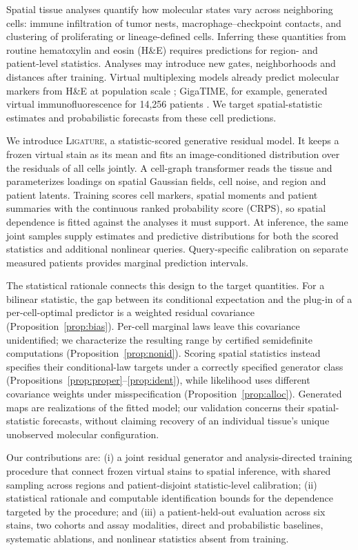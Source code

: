 \documentclass[10pt,letterpaper]{article}
\theoremstyle{definition}
\theoremstyle{remark}
\newcommand{\method}{\textnormal{\textsc{Ligature}}}
\begin{document}
Spatial tissue analyses quantify how molecular states vary across neighboring cells: immune infiltration of tumor nests, macrophage--checkpoint contacts, and clustering of proliferating or lineage-defined cells. Inferring these quantities from routine hematoxylin and eosin (H\&E) requires predictions for region- and patient-level statistics. Analyses may introduce new gates, neighborhoods and distances after training. Virtual multiplexing models already predict molecular markers from H\&E at population scale \citep{gigatime2025,rosie2025,hex2026}; GigaTIME, for example, generated virtual immunofluorescence for 14,256 patients \citep{gigatime2025}. We target spatial-statistic estimates and probabilistic forecasts from these cell predictions.

We introduce \method{}, a statistic-scored generative residual model. It keeps a frozen virtual stain as its mean and fits an image-conditioned distribution over the residuals of all cells jointly. A cell-graph transformer reads the tissue and parameterizes loadings on spatial Gaussian fields, cell noise, and region and patient latents. Training scores cell markers, spatial moments and patient summaries with the continuous ranked probability score (CRPS), so spatial dependence is fitted against the analyses it must support. At inference, the same joint samples supply estimates and predictive distributions for both the scored statistics and additional nonlinear queries. Query-specific calibration on separate measured patients provides marginal prediction intervals.

The statistical rationale connects this design to the target quantities. For a bilinear statistic, the gap between its conditional expectation and the plug-in of a per-cell-optimal predictor is a weighted residual covariance (Proposition~\ref{prop:bias}). Per-cell marginal laws leave this covariance unidentified; we characterize the resulting range by certified semidefinite computations (Proposition~\ref{prop:nonid}). Scoring spatial statistics instead specifies their conditional-law targets under a correctly specified generator class (Propositions~\ref{prop:proper}--\ref{prop:ident}), while likelihood uses different covariance weights under misspecification (Proposition~\ref{prop:alloc}). Generated maps are realizations of the fitted model; our validation concerns their spatial-statistic forecasts, without claiming recovery of an individual tissue's unique unobserved molecular configuration.

Our contributions are: (i) a joint residual generator and analysis-directed training procedure that connect frozen virtual stains to spatial inference, with shared sampling across regions and patient-disjoint statistic-level calibration; (ii) statistical rationale and computable identification bounds for the dependence targeted by the procedure; and (iii) a patient-held-out evaluation across six stains, two cohorts and assay modalities, direct and probabilistic baselines, systematic ablations, and nonlinear statistics absent from training.
\end{document}
